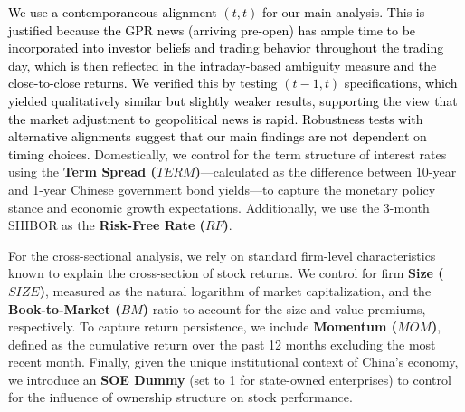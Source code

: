 \documentclass[preprint,12pt,authoryear]{elsarticle}
\begin{document}
\textcolor{black}{We use a contemporaneous alignment $(t, t)$ for our main analysis. This is justified because the GPR news (arriving pre-open) has ample time to be incorporated into investor beliefs and trading behavior throughout the trading day, which is then reflected in the intraday-based ambiguity measure and the close-to-close returns. We verified this by testing $(t-1, t)$ specifications, which yielded qualitatively similar but slightly weaker results, supporting the view that the market adjustment to geopolitical news is rapid. Robustness tests with alternative alignments \textcolor{black}{suggest} that our main findings are not \textcolor{black}{dependent on} timing choices.} Domestically, we control for the term structure of interest rates using the \textbf{Term Spread ($TERM$)}—calculated as the difference between 10-year and 1-year Chinese government bond yields—to capture the monetary policy stance and economic growth expectations. Additionally, we use the 3-month SHIBOR as the \textbf{Risk-Free Rate ($RF$)}.

For the cross-sectional analysis, we rely on standard firm-level characteristics known to explain the cross-section of stock returns. We control for firm \textbf{Size ($SIZE$)}, measured as the natural logarithm of market capitalization, and the \textbf{Book-to-Market ($BM$)} ratio to account for the size and value premiums, respectively. To capture return persistence, we include \textbf{Momentum ($MOM$)}, defined as the cumulative return over the past 12 months excluding the most recent month. Finally, given the unique institutional context of China's economy, we introduce an \textbf{SOE Dummy} (set to 1 for state-owned enterprises) to control for the influence of ownership structure on stock performance.
\end{document}
